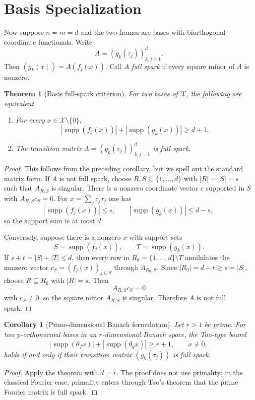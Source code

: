 \documentclass[11pt]{article}
\newtheorem{theorem}{Theorem}
\newtheorem{corollary}{Corollary}
\newcommand{\X}{\mathcal X}
\newcommand{\supp}{\operatorname{supp}}
\begin{document}
\section*{Basis Specialization}

Now suppose $n=m=d$ and the two frames are bases with biorthogonal coordinate functionals. Write
\[
A=(g_k(\tau_j))_{k,j=1}^d.
\]
Then $(g_k(x))=A(f_j(x))$. Call $A$ \emph{full spark} if every square minor of $A$ is nonzero.

\begin{theorem}[Basis full-spark criterion]
For two bases of $\X$, the following are equivalent.
\begin{enumerate}
\item For every $x\in \X\setminus\{0\}$,
\[
|\supp(f_j(x))|+|\supp(g_k(x))|\ge d+1.
\]
\item The transition matrix $A=(g_k(\tau_j))_{k,j=1}^d$ is full spark.
\end{enumerate}
\end{theorem}

\begin{proof}
This follows from the preceding corollary, but we spell out the standard matrix form. If $A$ is not full spark, choose $R,S\subseteq\{1,\dots,d\}$ with $|R|=|S|=s$ such that $A_{R,S}$ is singular. There is a nonzero coordinate vector $c$ supported in $S$ with $A_{R,S}c_S=0$. For $x=\sum_j c_j\tau_j$ one has
\[
|\supp(f_j(x))|\le s,\qquad |\supp(g_k(x))|\le d-s,
\]
so the support sum is at most $d$.

Conversely, suppose there is a nonzero $x$ with support sets
\[
S=\supp(f_j(x)),\qquad T=\supp(g_k(x)).
\]
If $s+t=|S|+|T|\le d$, then every row in $R_0=\{1,\dots,d\}\setminus T$ annihilates the nonzero vector $c_S=(f_j(x))_{j\in S}$ through $A_{R_0,S}$. Since $|R_0|=d-t\ge s=|S|$, choose $R\subseteq R_0$ with $|R|=s$. Then
\[
A_{R,S}c_S=0
\]
with $c_S\ne0$, so the square minor $A_{R,S}$ is singular. Therefore $A$ is not full spark.
\end{proof}

\begin{corollary}[Prime-dimensional Banach formulation]
Let $r>1$ be prime. For two p-orthonormal bases in an $r$-dimensional Banach space, the Tao-type bound
\[
|\supp(\theta_f x)|+|\supp(\theta_g x)|\ge r+1,\qquad x\ne0,
\]
holds if and only if their transition matrix $(g_k(\tau_j))$ is full spark.
\end{corollary}

\begin{proof}
Apply the theorem with $d=r$. The proof does not use primality; in the classical Fourier case, primality enters through Tao's theorem that the prime Fourier matrix is full spark.
\end{proof}
\end{document}
